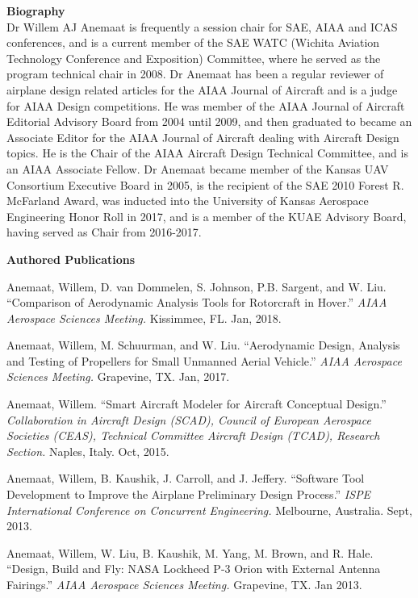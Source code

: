 \documentclass[11pt]{article}
\newcommand{\PubSpace}{\vspace{-0.12cm}}  %
\begin{document}
{\bf Biography} \\
Dr Willem AJ Anemaat is frequently a session chair for SAE, AIAA and ICAS conferences, and is a current member of the SAE WATC (Wichita Aviation Technology Conference and Exposition) Committee, where he served as the program technical chair in 2008.  Dr Anemaat has been a regular reviewer of airplane design related articles for the AIAA Journal of Aircraft and is a judge for AIAA Design competitions.  He was member of the AIAA Journal of Aircraft Editorial Advisory Board from 2004 until 2009, and then graduated to became an Associate Editor for the AIAA Journal of Aircraft dealing with Aircraft Design topics.  He is the Chair of the AIAA Aircraft Design Technical Committee, and is an AIAA Associate Fellow.  Dr Anemaat became member of the Kansas UAV Consortium Executive Board in 2005, is the recipient of the SAE 2010 Forest R. McFarland Award, was inducted into the University of Kansas Aerospace Engineering Honor Roll in 2017, and is a member of the KUAE Advisory Board, having served as Chair from 2016-2017.


{\bf Authored Publications} \\
\vspace{-0.2in}

\PubSpace
Anemaat, Willem, D. van Dommelen, S. Johnson, P.B. Sargent, and W. Liu.
``Comparison of Aerodynamic Analysis Tools for Rotorcraft in Hover.''
\emph{AIAA Aerospace Sciences Meeting.}
Kissimmee, FL.
Jan, 2018.

\PubSpace
Anemaat, Willem, M. Schuurman, and W. Liu.
``Aerodynamic Design, Analysis and Testing of Propellers for Small Unmanned Aerial Vehicle.''
\emph{AIAA Aerospace Sciences Meeting.}
Grapevine, TX.
Jan, 2017.

\PubSpace
Anemaat, Willem.
``Smart Aircraft Modeler for Aircraft Conceptual Design.''
\emph{Collaboration in Aircraft Design (SCAD), Council of European Aerospace Societies (CEAS), Technical Committee Aircraft Design (TCAD), Research Section.}
Naples, Italy.
Oct, 2015.

\PubSpace
Anemaat, Willem, B. Kaushik, J. Carroll, and J. Jeffery.
``Software Tool Development to Improve the Airplane Preliminary Design Process.''
\emph{ISPE International Conference on Concurrent Engineering.}
Melbourne, Australia.
Sept, 2013.

\PubSpace
Anemaat, Willem, W. Liu, B. Kaushik, M. Yang, M. Brown, and R. Hale.
``Design, Build and Fly: NASA Lockheed P-3 Orion with External Antenna Fairings.''
\emph{AIAA Aerospace Sciences Meeting.}
Grapevine, TX.
Jan 2013.
\end{document}
